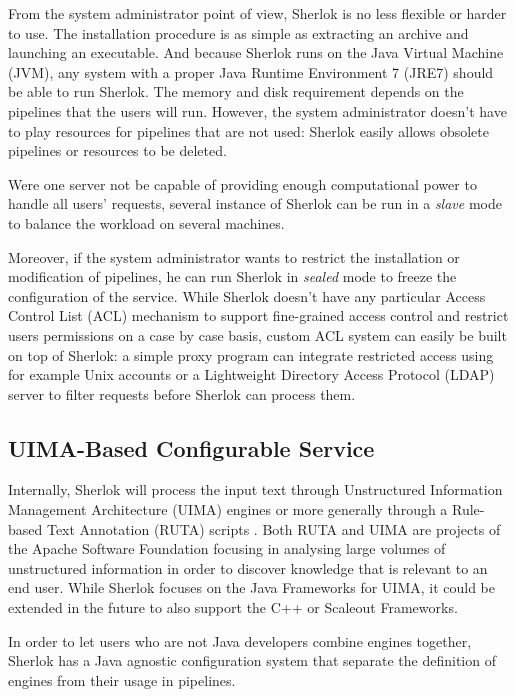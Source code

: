 \documentclass{article}
\begin{document}
From the system administrator point of view, Sherlok is no less flexible or harder to use. The
installation procedure is as simple as extracting an archive and launching an executable. And
because Sherlok runs on the Java Virtual Machine (JVM), any system with a proper Java Runtime
Environment 7 (JRE7) should be able to run Sherlok. The memory and disk requirement depends
on the pipelines that the users will run. However, the system administrator doesn't have to play
resources for pipelines that are not used: Sherlok easily allows obsolete pipelines or resources to
be deleted.

Were one server not be capable of providing enough computational power to handle all users'
requests, several instance of Sherlok can be run in a \emph{slave} mode to balance the workload on
several machines.

Moreover, if the system administrator wants to restrict the installation or modification of
pipelines, he can run Sherlok in \emph{sealed} mode to freeze the configuration of the service.
While Sherlok doesn't have any particular Access Control List (ACL) mechanism to support
fine-grained access control and restrict users permissions on a case by case basis, custom ACL
system can easily be built on top of Sherlok: a simple proxy program can integrate restricted access
using for example Unix accounts or a Lightweight Directory Access Protocol (LDAP) server to filter
requests before Sherlok can process them.

\subsection{UIMA-Based Configurable Service}

Internally, Sherlok will process the input text through Unstructured Information Management
Architecture (UIMA) \cite{uima} engines or more generally through a Rule-based Text Annotation
(RUTA) scripts \cite{ruta}. Both RUTA and UIMA are projects of the Apache Software Foundation
\cite{apachefundation} focusing in analysing large volumes of unstructured information in order to
discover knowledge that is relevant to an end user. While Sherlok focuses on the Java Frameworks for
UIMA, it could be extended in the future to also support the C++ or Scaleout Frameworks.

In order to let users who are not Java developers combine engines together, Sherlok has a Java
agnostic configuration system that separate the definition of engines from their usage in pipelines.
\end{document}
